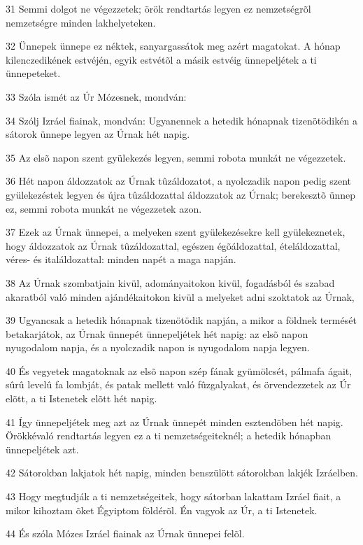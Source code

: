 \par 31 Semmi dolgot ne végezzetek; örök rendtartás legyen ez nemzetségrõl nemzetségre minden lakhelyeteken.
\par 32 Ünnepek ünnepe ez néktek, sanyargassátok meg azért magatokat. A hónap kilenczedikének estvéjén, egyik estvétõl a másik estvéig ünnepeljétek a ti ünnepeteket.
\par 33 Szóla ismét az Úr Mózesnek, mondván:
\par 34 Szólj Izráel fiainak, mondván: Ugyanennek a hetedik hónapnak tizenötödikén a sátorok ünnepe legyen az Úrnak hét napig.
\par 35 Az elsõ napon szent gyülekezés legyen, semmi robota munkát ne végezzetek.
\par 36 Hét napon áldozzatok az Úrnak tûzáldozatot, a nyolczadik napon pedig szent gyülekezéstek legyen és újra tûzáldozattal áldozzatok az Úrnak; berekesztõ ünnep ez, semmi robota munkát ne végezzetek azon.
\par 37 Ezek az Úrnak ünnepei, a melyeken szent gyülekezésekre kell gyülekeznetek, hogy áldozzatok az Úrnak tûzáldozattal, egészen égõáldozattal, ételáldozattal, véres- és italáldozattal: minden napét a maga napján.
\par 38 Az Úrnak szombatjain kivül, adományaitokon kivül, fogadásból és szabad akaratból való minden ajándékaitokon kivül a melyeket adni szoktatok az Úrnak,
\par 39 Ugyancsak a hetedik hónapnak tizenötödik napján, a mikor a földnek termését betakarjátok, az Úrnak ünnepét ünnepeljétek hét napig: az elsõ napon nyugodalom napja, és a nyolczadik napon is nyugodalom napja legyen.
\par 40 És vegyetek magatoknak az elsõ napon szép fának gyümölcsét, pálmafa ágait, sûrû levelû fa lombját, és patak mellett való fûzgalyakat, és örvendezzetek az Úr elõtt, a ti Istenetek elõtt hét napig.
\par 41 Így ünnepeljétek meg azt az Úrnak ünnepét minden esztendõben hét napig. Örökkévaló rendtartás legyen ez a ti nemzetségeiteknél; a hetedik hónapban ünnepeljétek azt.
\par 42 Sátorokban lakjatok hét napig, minden benszülött sátorokban lakjék Izráelben.
\par 43 Hogy megtudják a ti nemzetségeitek, hogy sátorban lakattam Izráel fiait, a mikor kihoztam õket Égyiptom földérõl. Én vagyok az Úr, a ti Istenetek.
\par 44 És szóla Mózes Izráel fiainak az Úrnak ünnepei felõl.

